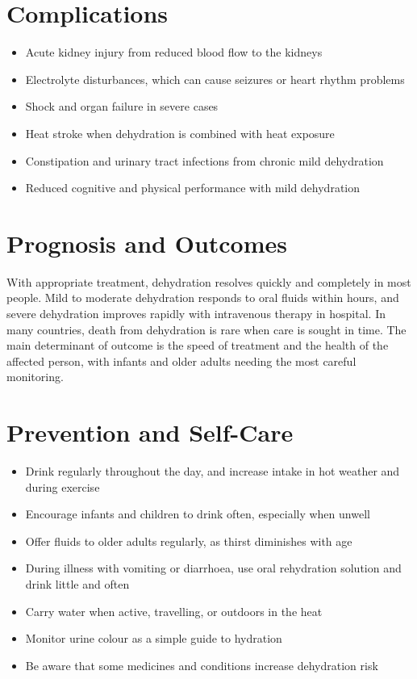 \section*{Complications}
\begin{itemize}
    \item Acute kidney injury from reduced blood flow to the kidneys
    \item Electrolyte disturbances, which can cause seizures or heart rhythm problems
    \item Shock and organ failure in severe cases
    \item Heat stroke when dehydration is combined with heat exposure
    \item Constipation and urinary tract infections from chronic mild dehydration
    \item Reduced cognitive and physical performance with mild dehydration
\end{itemize}

\section*{Prognosis and Outcomes}
With appropriate treatment, dehydration resolves quickly and completely in most people. Mild to moderate dehydration responds to oral fluids within hours, and severe dehydration improves rapidly with intravenous therapy in hospital. In many countries, death from dehydration is rare when care is sought in time. The main determinant of outcome is the speed of treatment and the health of the affected person, with infants and older adults needing the most careful monitoring.

\section*{Prevention and Self-Care}
\begin{itemize}
    \item Drink regularly throughout the day, and increase intake in hot weather and during exercise
    \item Encourage infants and children to drink often, especially when unwell
    \item Offer fluids to older adults regularly, as thirst diminishes with age
    \item During illness with vomiting or diarrhoea, use oral rehydration solution and drink little and often
    \item Carry water when active, travelling, or outdoors in the heat
    \item Monitor urine colour as a simple guide to hydration
    \item Be aware that some medicines and conditions increase dehydration risk
\end{itemize}

